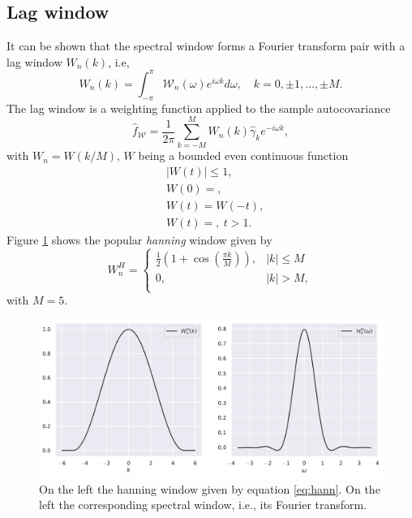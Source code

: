 \documentclass[a4paper]{memoir}
\theoremstyle{plain}
\theoremstyle{definition}
\theoremstyle{remark}
\begin{document}
\subsection{Lag window}
It can be shown \cite{wei} that the spectral window forms a Fourier transform pair with a lag window $W_n(k)$, i.e,
\begin{equation*}
        W_n(k) = \int_{-\pi}^{\pi}\mathcal{W}_n(\omega) e^{i\omega k}d\omega, \quad k = 0, \pm 1, \hdots, \pm M.
\end{equation*}
The lag window is a weighting function applied to the sample autocovariance 
\begin{equation*}
        \hat{f}_\mathcal{W} = \frac{1}{2\pi} \sum_{k = -M}^{M}W_n(k) \hat{\gamma}_k e^{-i\omega k},
\end{equation*}
with $W_n = W(k/M)$, $W$ being a bounded even continuous function 
\begin{align*}
        &|W(t)| \leq 1, \\
        &W(0) =, \\
        &W(t) = W(-t), \\
        &W(t) = , \  t > 1.
\end{align*}
Figure \ref{fig:windows} shows the popular \textit{hanning} window given by 
\begin{equation}\label{eq:hann}
        W_n^H=
                \begin{cases}
                      \frac{1}{2}(1 + \cos(\frac{\pi k}{M})),   & |k| \leq M \\
                       0,  & |k| > M, \\
                \end{cases}
\end{equation}
with $M = 5$.


\begin{figure}[tb ]
        \centering
        \includegraphics[width=\linewidth]{./code/figures/windows.pdf}
        \caption{On the left the hanning window given by equation \eqref{eq:hann}.
        On the left the corresponding spectral window, i.e., its Fourier transform.}
        \label{fig:windows}
\end{figure}
\end{document}

